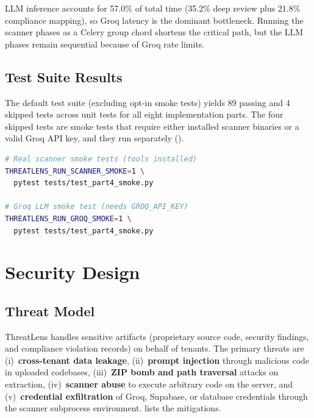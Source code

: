 \documentclass[conference]{IEEEtran}
\begin{document}
LLM inference accounts for 57.0\% of total time (35.2\% deep review plus 21.8\%
compliance mapping), so Groq latency is the dominant bottleneck. Running the
scanner phases as a Celery group chord shortens the critical path, but the LLM
phases remain sequential because of Groq rate limits.

\subsection{Test Suite Results}
The default test suite (excluding opt-in smoke tests) yields 89 passing and 4
skipped tests across unit tests for all eight implementation parts. The four
skipped tests are smoke tests that require either installed scanner binaries or
a valid Groq API key, and they run separately ().

\begin{lstlisting}[language=bash, label={lst:smoke},
  caption={Smoke tests requiring external tools or credentials.}]
# Real scanner smoke tests (tools installed)
THREATLENS_RUN_SCANNER_SMOKE=1 \
  pytest tests/test_part4_smoke.py

# Groq LLM smoke test (needs GROQ_API_KEY)
THREATLENS_RUN_GROQ_SMOKE=1 \
  pytest tests/test_part4_smoke.py
\end{lstlisting}

\section{Security Design}
\label{sec:security}

\subsection{Threat Model}
ThreatLens handles sensitive artifacts (proprietary source code, security
findings, and compliance violation records) on behalf of tenants. The primary
threats are (i)~\textbf{cross-tenant data leakage}, (ii)~\textbf{prompt
injection} through malicious code in uploaded codebases, (iii)~\textbf{ZIP bomb
and path traversal} attacks on extraction, (iv)~\textbf{scanner abuse} to
execute arbitrary code on the server, and (v)~\textbf{credential exfiltration}
of Groq, Supabase, or database credentials through the scanner subprocess
environment. \Cref{tab:security} lists the mitigations.
\end{document}
